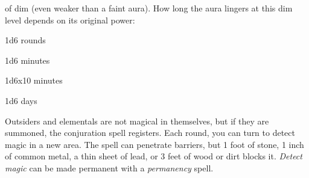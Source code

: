 of dim (even weaker than a faint aura). How long the aura lingers at this dim level
depends on its original power:
\begin{description*}
\item[Faint] 1d6 rounds
\item[Moderate] 1d6 minutes
\item[Strong] 1d6x10 minutes
\item[Overwhelming] 1d6 days
\end{description*}
Outsiders and elementals are not magical in themselves, but if they are summoned,
the conjuration spell registers.
Each round, you can turn to detect magic in a new area. The spell can penetrate
barriers, but 1 foot of stone, 1 inch of common metal, a thin sheet of lead, or
3 feet of wood or dirt blocks it.
\textit{Detect magic} can be made permanent with a \textit{permanency} spell.